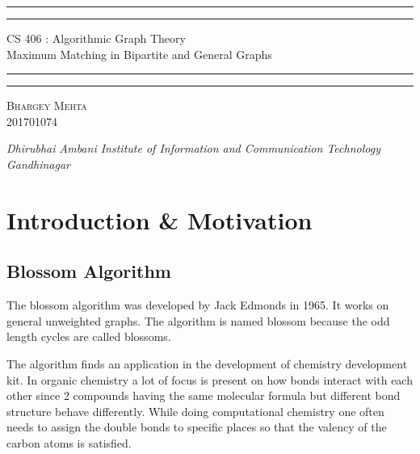 \documentclass[oneside]{book}
\begin{document}
\begin{titlepage}
	\centering 
	\scshape
	\vspace*{12\baselineskip}
	\rule{\textwidth}{1.6pt}\vspace*{-\baselineskip}\vspace*{2pt}
	\rule{\textwidth}{0.4pt} 
	\vspace{0.75\baselineskip}
	
	{\Large CS 406 : Algorithmic Graph Theory}{ \\\vspace{0.75\baselineskip} \LARGE Maximum Matching in Bipartite and General Graphs}
	\vspace{0.75\baselineskip}
	
	\rule{\textwidth}{0.4pt}\vspace*{-\baselineskip}\vspace{3.2pt} 
	\rule{\textwidth}{1.6pt}
	
	
	\vspace*{3\baselineskip}
	{\scshape\Large Bhargey Mehta\\ 201701074}
	
	\vspace{3\baselineskip} %
	
	
	\vspace{1\baselineskip} 
	
	\textit{\large Dhirubhai Ambani Institute of Information and Communication Technology \\ Gandhinagar\\} 
	


\end{titlepage}

\chapter{Introduction \& Motivation}
\section{Blossom Algorithm}
The blossom algorithm was developed by Jack Edmonds in 1965. It works on general unweighted graphs. The algorithm is named blossom because the odd length cycles are called blossoms.

The algorithm finds an application in the development of chemistry development kit. In organic chemistry a lot of focus is present on how bonds interact with each other since 2 compounds having the same molecular formula but different bond structure behave differently. While doing computational chemistry one often needs to assign the double bonds to specific places so that the valency of the carbon atoms is satisfied.
\end{document}

